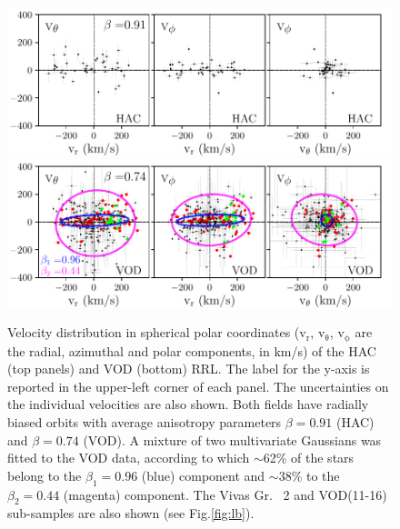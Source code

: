 \documentclass[a4paper,useAMS,usenatbib]{mnras}
\begin{document}
\begin{figure}
	\includegraphics[scale=0.55]{HAC_allv.pdf}
  \includegraphics[scale=0.55]{VOD_allv.pdf}
   \vspace{-0.45cm}
    \caption{Velocity distribution in spherical polar coordinates
      ($\mathrm{v_{r}}$, $\mathrm{v_{\theta}}$, $\mathrm{v_{\phi}}$
      are the radial, azimuthal and polar components, in
      km/s) of the HAC (top panels) and VOD (bottom) RRL.
      The label for the y-axis is reported in the upper-left corner of
      each panel. The uncertainties on the individual velocities are also shown. Both fields have radially biased
      orbits with average anisotropy parameters $\beta= 0.91$ (HAC)
      and $\beta= 0.74$ (VOD). A mixture of two multivariate
      Gaussians was fitted to the VOD data, according to which
      $\sim$62\% of the stars belong to the $\beta_{1}=
      0.96$ (blue) component and $\sim$38\% to the
      $\beta_{2}=0.44$ (magenta) component. The Vivas
      Gr. ~2 and VOD(11-16) sub-samples are also shown (see Fig.\ref{fig:lb}). }%
    \label{fig:vel}
\end{figure}
%
\end{document}
